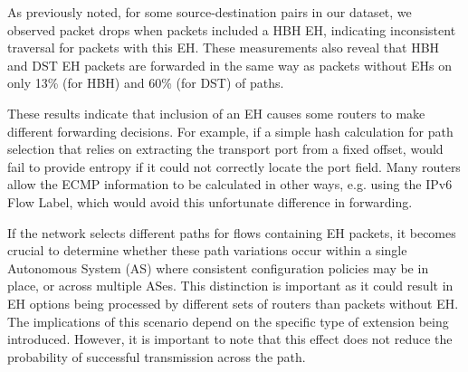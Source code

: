\documentclass[conference]{IEEEtran}
\begin{document}


As previously noted, for some source-destination pairs in our dataset, we
observed packet drops when packets included a HBH EH, indicating
inconsistent traversal for packets with this EH. These measurements also reveal
that HBH and DST EH packets are forwarded in the same way as packets without
EHs on only 13\% (for HBH) and 60\% (for DST) of paths.

These results indicate that inclusion of an EH causes some routers to make
different forwarding decisions.  For example, if a simple hash calculation for
path selection that relies on extracting the transport port from a fixed
offset, would fail to provide entropy if it could not correctly locate the port
field. Many routers allow the ECMP information to be calculated in other ways,
e.g. using the IPv6 Flow Label, which would avoid this unfortunate difference
in forwarding.


If the network selects different paths for flows containing EH packets, it
becomes crucial to determine whether these path variations occur within a
single Autonomous System (AS) where consistent configuration policies may be in
place, or across multiple ASes. This distinction is important as it could
result in EH options being processed by different sets of routers than packets
without EH. The implications of this scenario depend on the specific type of
extension being introduced. However, it is important to note that this effect
does not reduce the probability of successful transmission across the path.


\end{document}
